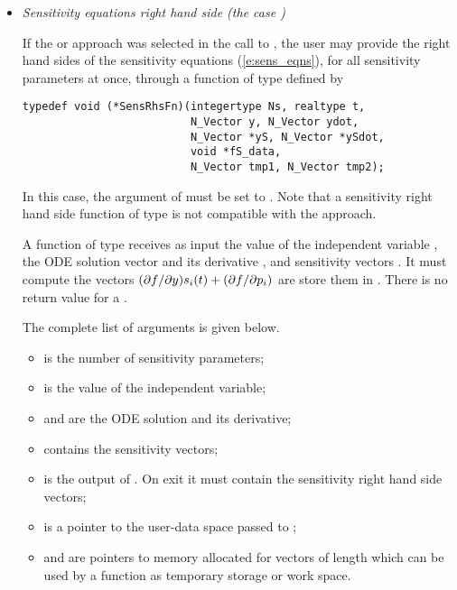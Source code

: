 \begin{itemize}
%
\item {\em Sensitivity equations right hand side (the case )}

  If the  or  approach was selected in the call to
  , the user may provide the right hand sides of the sensitivity equations
  (\ref{e:sens_eqns}), for all sensitivity parameters at once, through a function 
  of type  defined by
\begin{verbatim}
typedef void (*SensRhsFn)(integertype Ns, realtype t, 
                          N_Vector y, N_Vector ydot, 
                          N_Vector *yS, N_Vector *ySdot, 
                          void *fS_data,  
                          N_Vector tmp1, N_Vector tmp2);
\end{verbatim}
  In this case, the argument  of  must be set to .
  Note that a sensitivity right hand side function of type  is not
  compatible with the  approach.

  A function of type   receives as input the value of the independent
  variable , the ODE solution vector  and its derivative , 
  and sensitivity vectors . It must compute the vectors
  $(\partial f / \partial y) s_i(t) + (\partial f / \partial p_i)$ are store them in . 
  There is no return value for a .

  The complete list of arguments is given below.
  \begin{itemize}
  \item {} is the number of sensitivity parameters;
  \item {} is the value of the independent variable;
  \item {} and  are the ODE solution and its derivative;
  \item {} contains the  sensitivity vectors;
  \item {} is the output of . On exit it must contain
    the sensitivity right hand side vectors;
  \item {} is a pointer to the user-data space passed to ;
  \item {} and  are pointers to memory allocated
    for vectors of length  which can be used by a  
    function as temporary storage or work space.
  \end{itemize}


\end{itemize}
